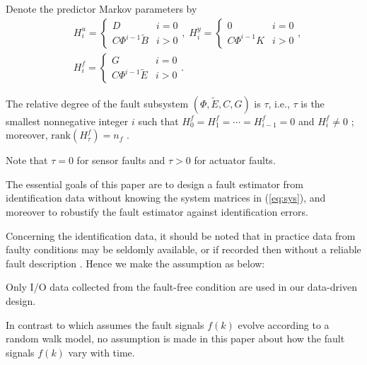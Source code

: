 \documentclass[twocolumn]{autart}
\begin{document}
Denote the predictor Markov parameters by
\begin{equation}\label{eq:markov_param}
\begin{aligned}
& H_i^u = \left\{ \begin{array}{ll}
D & i=0 \\
C \Phi^{i-1} \tilde B & i>0
\end{array} \right. , \;
H_i^y = \left\{ \begin{array}{ll}
0 & i=0 \\
C \Phi^{i-1} K & i>0
\end{array} \right. , \\
& H_i^f = \left\{ \begin{array}{ll}
G & i=0 \\
C \Phi^{i-1} \tilde E & i>0
\end{array} \right. .
\end{aligned}
\end{equation}
\vspace*{-0.5cm}


\begin{assum}\label{ass:fault_rank}
	The relative degree of the fault subsystem $\left(\Phi, \tilde E, C, G\right)$ is $\tau$, i.e., $\tau$ is the smallest nonnegative integer $i$ such that $H_0^f = H_1^f = \cdots = H_{i-1}^f = 0$ and $H_i^f \neq 0$ \cite{Kirt2011}; moreover, 
	$\mathrm{rank}\left(H_\tau^f\right) = n_f$ \cite{Dong2012c}.
\end{assum}
Note that $\tau=0$ for sensor faults and $\tau > 0$ for actuator faults.






The essential goals of this paper are to design a fault estimator from identification data without knowing the system matrices in (\ref{eq:sys}), and moreover to robustify the fault estimator against identification errors.

Concerning the identification data, it should be noted that in practice data from faulty conditions may be seldomly available, or if recorded then without a reliable fault description \cite{Ding2014JPC}. Hence we make the assumption as below:
\begin{assum}\label{ass:data}
Only I/O data collected from the fault-free condition are used in our data-driven design.
\end{assum}

In contrast to \cite{Park2000} which assumes the fault signals $f(k)$ evolve according to a random walk model, no assumption is made in this paper about how the fault signals $f(k)$ vary with time.
\end{document}
